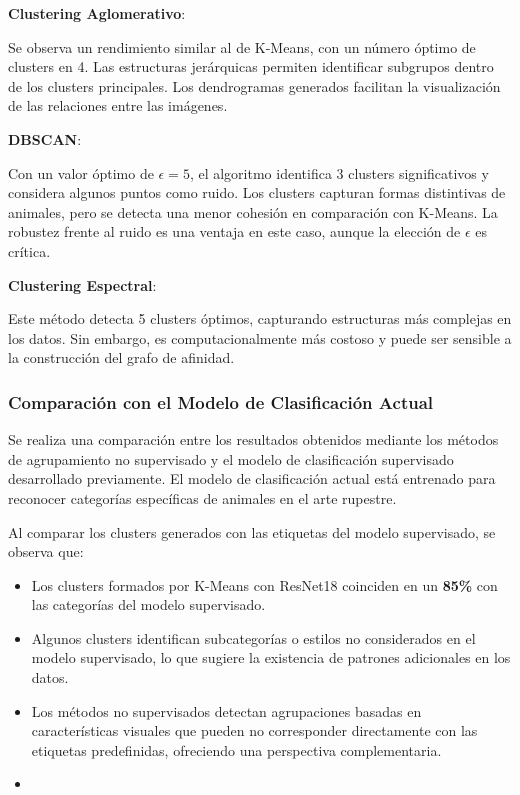 \textbf{Clustering Aglomerativo}:

Se observa un rendimiento similar al de K-Means, con un número óptimo de clusters en 4. Las estructuras jerárquicas permiten identificar subgrupos dentro de los clusters principales. Los dendrogramas generados facilitan la visualización de las relaciones entre las imágenes.

\textbf{DBSCAN}:

Con un valor óptimo de $\epsilon=5$, el algoritmo identifica 3 clusters significativos y considera algunos puntos como ruido. Los clusters capturan formas distintivas de animales, pero se detecta una menor cohesión en comparación con K-Means. La robustez frente al ruido es una ventaja en este caso, aunque la elección de $\epsilon$ es crítica.

\textbf{Clustering Espectral}:

Este método detecta 5 clusters óptimos, capturando estructuras más complejas en los datos. Sin embargo, es computacionalmente más costoso y puede ser sensible a la construcción del grafo de afinidad.


\subsubsection{Comparación con el Modelo de Clasificación Actual}

Se realiza una comparación entre los resultados obtenidos mediante los métodos de agrupamiento no supervisado y el modelo de clasificación supervisado desarrollado previamente. El modelo de clasificación actual está entrenado para reconocer categorías específicas de animales en el arte rupestre.

Al comparar los clusters generados con las etiquetas del modelo supervisado, se observa que:

\begin{itemize}
    \item Los clusters formados por K-Means con ResNet18 coinciden en un \textbf{85\%} con las categorías del modelo supervisado.
    \item Algunos clusters identifican subcategorías o estilos no considerados en el modelo supervisado, lo que sugiere la existencia de patrones adicionales en los datos.
    \item Los métodos no supervisados detectan agrupaciones basadas en características visuales que pueden no corresponder directamente con las etiquetas predefinidas, ofreciendo una perspectiva complementaria.
\item \end{itemize}


